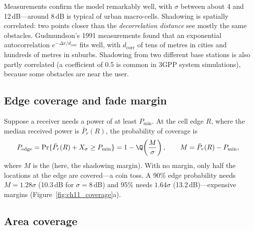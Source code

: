 Measurements confirm the model remarkably well, with $\sigma$ between about 4 and 12\,dB---around
8\,dB is typical of urban macro-cells. Shadowing is spatially correlated: two points closer
than the \emph{decorrelation distance} see mostly the same obstacles. Gudmundson's 1991
measurements found that an exponential autocorrelation $e^{-\Delta x/d_{\text{corr}}}$ fits
well, with $d_{\text{corr}}$ of tens of metres in cities and hundreds of metres in suburbs.
Shadowing from two different base stations is also partly correlated (a coefficient of 0.5 is
common in 3GPP system simulations), because some obstacles are near the user.


\subsection{Edge coverage and fade margin}

Suppose a receiver needs a power of at least $P_{\min}$. At the cell edge $R$, where the median
received power is $\bar P_r(R)$, the probability of coverage is
\begin{equation}
P_{\text{edge}}=\Pr\{\bar P_r(R)+X_\sigma\ge P_{\min}\}=1-\Q\!\left(\frac{M}{\sigma}\right),\qquad
M=\bar P_r(R)-P_{\min},
\end{equation}
where $M$ is the  (here, the shadowing margin). With no margin, only half the
locations at the edge are covered---a coin toss. A 90\% edge probability needs $M=1.28\sigma$
(10.3\,dB for $\sigma=8$\,dB) and 95\% needs $1.64\sigma$ (13.2\,dB)---expensive margins
(Figure~\ref{fig:ch11_coverage}a).

\subsection{Area coverage}

